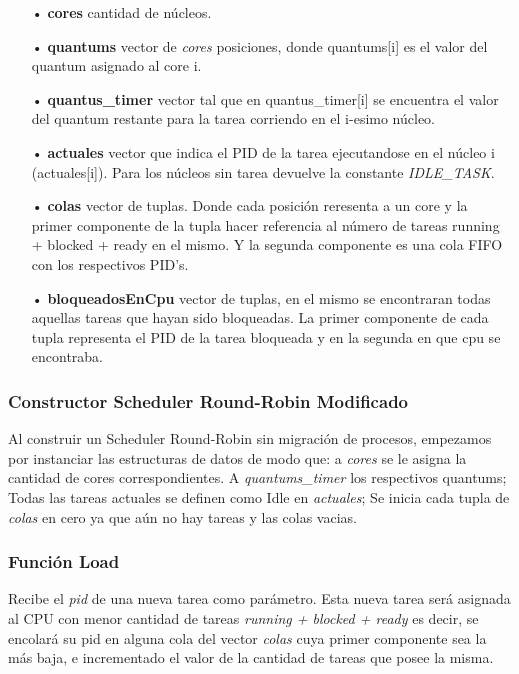 \documentclass[a4paper]{article}
\begin{document}
	\begin{itemize}
	\item[•]\textbf{cores} cantidad de n\'ucleos.
	\item[•]\textbf{quantums} vector de \emph{cores} posiciones, donde quantums[i] es el valor del quantum asignado al core i.
	\item[•]\textbf{quantus_timer}  vector tal que en quantus_timer[i] se encuentra el valor del quantum restante para la tarea corriendo en el i-esimo núcleo.
	\item[•]\textbf{actuales} vector que indica el PID de la tarea ejecutandose en el núcleo i (actuales[i]). Para los núcleos sin tarea devuelve la constante \textit{IDLE\_TASK}.

	\item[•]\textbf{colas} vector de tuplas. Donde cada posición reresenta a un core y la primer componente de la tupla hacer referencia al número de tareas running + blocked + ready en el mismo. Y la segunda componente es una cola FIFO con los respectivos PID's.  
	\item[•]\textbf{bloqueadosEnCpu} vector de tuplas, en el mismo se encontraran todas aquellas tareas que hayan sido bloqueadas. La primer componente de cada tupla representa el PID de la tarea bloqueada y en la segunda en que cpu se encontraba.


	\end{itemize}	
	
		
\subsubsection*{Constructor Scheduler Round-Robin Modificado}		

Al construir un Scheduler Round-Robin sin migración de procesos, empezamos por instanciar las estructuras de datos de modo que: a \emph{cores} se le asigna la cantidad de cores correspondientes. A \emph{quantums\_timer} los respectivos quantums; Todas las tareas actuales se definen como Idle en \emph{actuales}; Se inicia cada tupla de \emph{colas} en cero ya que aún no hay tareas y las colas vacias.
\subsubsection*{Funci\'on Load}

Recibe el \emph{pid} de una nueva tarea como par\'ametro. Esta nueva tarea será asignada al CPU con menor cantidad de tareas \emph{running + blocked + ready} es decir, se encolar\'a su pid en alguna cola del vector \emph{colas} cuya primer componente sea la más baja, e incrementado el valor de la cantidad de tareas que posee la misma.
\end{document}
